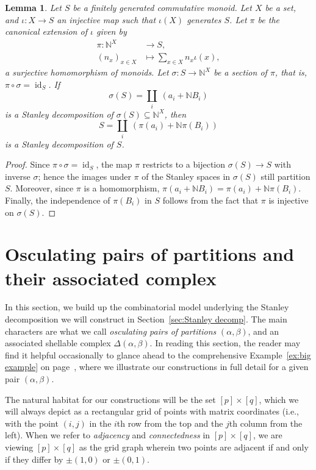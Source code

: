 \documentclass[noamsfonts,10pt]{amsart}
\newcommand{\N}{\mathbb{N}}
\newcommand{\al}{\alpha}
\newcommand{\be}{\beta}
\newcommand{\1}{\mathbf{1}}
\theoremstyle{plain}
\newtheorem{lemma}[theorem]{Lemma}
\theoremstyle{definition}
\numberwithin{equation}{section}
\begin{document}
\begin{lemma}
    \label{lemma:section}
    Let $S$ be a finitely generated commutative monoid.
    Let $X$ be a set, and $\iota : X \longrightarrow S$ an injective map such that $\iota(X)$ generates $S$.
    Let $\pi$ be the canonical extension of $\iota$ given by
    \begin{align*}
        \pi : \N^X & \longrightarrow S, \\
        (n_x)_{x \in X} & \longmapsto \sum_{x \in X} n_x \iota(x),
    \end{align*}
    a surjective homomorphism of monoids.
    Let $\sigma : S \longrightarrow \N^X$ be a section of $\pi$, that is, $\pi \circ \sigma = \operatorname{id}_S$.
    If
    \[
        \sigma(S) = \coprod_{i} \: (a_i + \N B_i)
    \]
    is a Stanley decomposition of $\sigma(S) \subseteq \N^X$, then
    \[
        S = \coprod_{i} \: (\pi(a_i) + \N \pi(B_i))
    \]
    is a Stanley decomposition of $S$.
    
\end{lemma}

\begin{proof}
    Since $\pi \circ \sigma = \operatorname{id}_S$, the map $\pi$ restricts to a bijection $\sigma(S) \longrightarrow S$ with inverse $\sigma$; hence the images under $\pi$ of the Stanley spaces in $\sigma(S)$ still partition $S$.
    Moreover, since $\pi$ is a homomorphism, $\pi(a_i + \N B_i) = \pi(a_i) + \N \pi(B_i)$.
    Finally, the independence of $\pi(B_i)$ in $S$ follows from the fact that $\pi$ is injective on $\sigma(S)$.
\end{proof}

\section{Osculating pairs of partitions and their associated complex}
\label{sec:combinatorics}

In this section, we build up the combinatorial model underlying the Stanley decomposition we will construct in Section~\ref{sec:Stanley decomp}.
The main characters are what we call \emph{osculating pairs of partitions} $(\al,\be)$, and an associated shellable complex $\Delta(\al,\be)$.
In reading this section, the reader may find it helpful occasionally to glance ahead to the comprehensive Example~\ref{ex:big example} on page~\pageref{ex:big example}, where we illustrate our constructions in full detail for a given pair $(\al, \be)$.

The natural habitat for our constructions will be the set $[p] \times [q]$, which we will always depict as a rectangular grid of points with matrix coordinates (i.e., with the point $(i,j)$ in the $i$th row from the top and the $j$th column from the left).
When we refer to \emph{adjacency} and \emph{connectedness} in $[p] \times [q]$, we are viewing $[p] \times [q]$ as the grid graph wherein two points are adjacent if and only if they differ by $\pm( 1,0)$ or $\pm(0, 1)$. 
\end{document}
